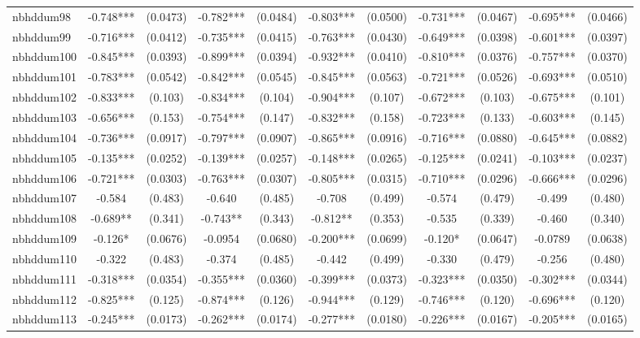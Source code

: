 \documentclass[]{article}
\begin{document}
\begin{tabular}{lcccccccccc}
nbhddum98 & -0.748*** & (0.0473) & -0.782*** & (0.0484) & -0.803*** & (0.0500) & -0.731*** & (0.0467) & -0.695*** & (0.0466) \\
nbhddum99 & -0.716*** & (0.0412) & -0.735*** & (0.0415) & -0.763*** & (0.0430) & -0.649*** & (0.0398) & -0.601*** & (0.0397) \\
nbhddum100 & -0.845*** & (0.0393) & -0.899*** & (0.0394) & -0.932*** & (0.0410) & -0.810*** & (0.0376) & -0.757*** & (0.0370) \\
nbhddum101 & -0.783*** & (0.0542) & -0.842*** & (0.0545) & -0.845*** & (0.0563) & -0.721*** & (0.0526) & -0.693*** & (0.0510) \\
nbhddum102 & -0.833*** & (0.103) & -0.834*** & (0.104) & -0.904*** & (0.107) & -0.672*** & (0.103) & -0.675*** & (0.101) \\
nbhddum103 & -0.656*** & (0.153) & -0.754*** & (0.147) & -0.832*** & (0.158) & -0.723*** & (0.133) & -0.603*** & (0.145) \\
nbhddum104 & -0.736*** & (0.0917) & -0.797*** & (0.0907) & -0.865*** & (0.0916) & -0.716*** & (0.0880) & -0.645*** & (0.0882) \\
nbhddum105 & -0.135*** & (0.0252) & -0.139*** & (0.0257) & -0.148*** & (0.0265) & -0.125*** & (0.0241) & -0.103*** & (0.0237) \\
nbhddum106 & -0.721*** & (0.0303) & -0.763*** & (0.0307) & -0.805*** & (0.0315) & -0.710*** & (0.0296) & -0.666*** & (0.0296) \\
nbhddum107 & -0.584 & (0.483) & -0.640 & (0.485) & -0.708 & (0.499) & -0.574 & (0.479) & -0.499 & (0.480) \\
nbhddum108 & -0.689** & (0.341) & -0.743** & (0.343) & -0.812** & (0.353) & -0.535 & (0.339) & -0.460 & (0.340) \\
nbhddum109 & -0.126* & (0.0676) & -0.0954 & (0.0680) & -0.200*** & (0.0699) & -0.120* & (0.0647) & -0.0789 & (0.0638) \\
nbhddum110 & -0.322 & (0.483) & -0.374 & (0.485) & -0.442 & (0.499) & -0.330 & (0.479) & -0.256 & (0.480) \\
nbhddum111 & -0.318*** & (0.0354) & -0.355*** & (0.0360) & -0.399*** & (0.0373) & -0.323*** & (0.0350) & -0.302*** & (0.0344) \\
nbhddum112 & -0.825*** & (0.125) & -0.874*** & (0.126) & -0.944*** & (0.129) & -0.746*** & (0.120) & -0.696*** & (0.120) \\
nbhddum113 & -0.245*** & (0.0173) & -0.262*** & (0.0174) & -0.277*** & (0.0180) & -0.226*** & (0.0167) & -0.205*** & (0.0165) \\

\end{tabular}
\end{document}
